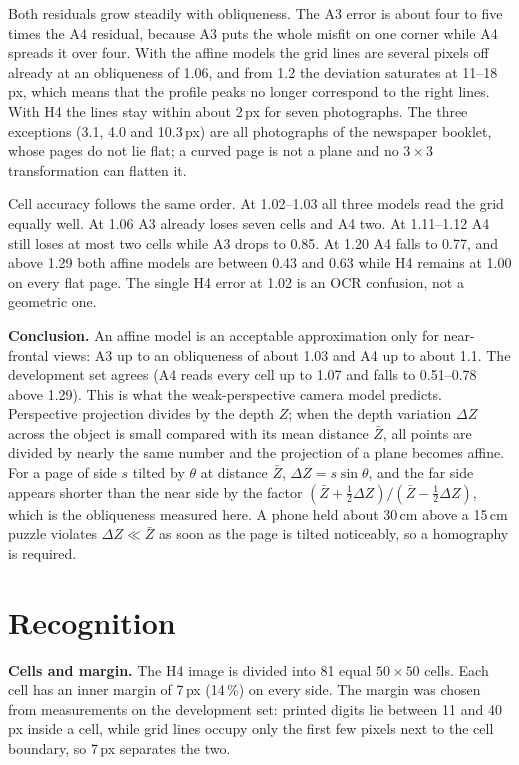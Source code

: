 \documentclass[conference]{IEEEtran}
\begin{document}
Both residuals grow steadily with obliqueness. The A3 error is about four to five
times the A4 residual, because A3 puts the whole misfit on
one corner while A4 spreads it over four. With the affine models the grid
lines are several pixels off already at an obliqueness of 1.06, and from
1.2 the deviation saturates at 11--18\,px, which means that the profile
peaks no longer correspond to the right lines. With H4 the lines stay within
about 2\,px for seven photographs. The three exceptions (3.1, 4.0 and
10.3\,px) are all photographs of the newspaper booklet, whose pages do not
lie flat; a curved page is not a plane and no $3\times3$ transformation can
flatten it.

Cell accuracy follows the same order. At 1.02--1.03 all three models read
the grid equally well. At 1.06 A3 already loses seven cells and A4 two. At
1.11--1.12 A4 still loses at most two cells while A3 drops to 0.85. At 1.20
A4 falls to 0.77, and above 1.29 both affine models are between 0.43 and
0.63 while H4 remains at 1.00 on every flat page. The single H4 error at
1.02 is an OCR confusion, not a geometric one.

\textbf{Conclusion.} An affine model is an acceptable approximation only for
near-frontal views: A3 up to an obliqueness of about 1.03 and A4 up to about
1.1. The development set agrees (A4 reads every cell up to 1.07 and falls to
0.51--0.78 above 1.29). This is what the weak-perspective camera model
predicts. Perspective projection divides by the depth $Z$; when the depth
variation $\Delta Z$ across the object is small compared with its mean
distance $\bar Z$, all points are divided by nearly the same number and the
projection of a plane becomes affine. For a page of side $s$ tilted by
$\theta$ at distance $\bar Z$, $\Delta Z = s\sin\theta$, and the far side
appears shorter than the near side by the factor
$(\bar Z + \tfrac{1}{2}\Delta Z)/(\bar Z - \tfrac{1}{2}\Delta Z)$, which is
the obliqueness measured here. A phone held about 30\,cm above a 15\,cm
puzzle violates $\Delta Z \ll \bar Z$ as soon as the page is tilted
noticeably, so a homography is required.

\section{Recognition}
\textbf{Cells and margin.} The H4 image is divided into 81 equal
$50\times50$ cells. Each cell has an inner margin of 7\,px (14\,\%) on every
side. The margin was chosen from measurements on the development set:
printed digits lie between 11 and 40\,px inside a cell, while grid lines
occupy only the first few pixels next to the cell boundary, so 7\,px
separates the two.
\end{document}
